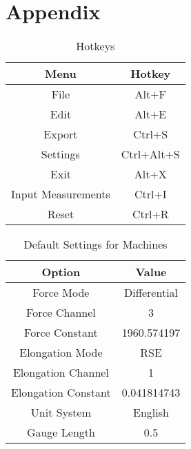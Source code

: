 \documentclass[12pt,letterpaper, USenglish]{article}
\theoremstyle{definition}
\numberwithin{theorem}{section}
\numberwithin{lemma}{section}
\numberwithin{corollary}{section}
\numberwithin{definition}{section}
\numberwithin{example}{section}
\numberwithin{equation}{theorem}
\begin{document}
\pagebreak
\section{Appendix}

\begin{table}[H]
    \centering
    \begin{tabular}{|c|c|}
        \hline
        \rowcolor{columbiablue}
        Menu & Hotkey \\
        \hline
        File & Alt+F \\
        \hline
         Edit & Alt+E \\
         \hline
         Export & Ctrl+S \\
         \hline
         Settings & Ctrl+Alt+S \\
         \hline
         Exit & Alt+X \\
         \hline
         Input Measurements & Ctrl+I \\
         \hline
         Reset & Ctrl+R \\
         \hline
         
    \end{tabular}
    \caption{Hotkeys}
    \label{hotkeys}
\end{table}

\begin{table}[H]
    \centering
    \begin{tabular}{|c|c|}
        \hline
        \rowcolor{columbiablue}
        Option & Value\\
        \hline
        Force Mode & Differential \\
        \hline
        Force Channel & 3 \\
        \hline 
        Force Constant & 1960.574197 \\
        \hline 
        Elongation Mode & RSE \\
        \hline
        Elongation Channel & 1\\
        \hline
        Elongation Constant & 0.041814743\\
        \hline
        Unit System & English\\
        \hline
        Gauge Length & 0.5\\
        \hline
    \end{tabular}
    \caption{Default Settings for Machines}
    \label{settingsTable}
\end{table}
\end{document}

